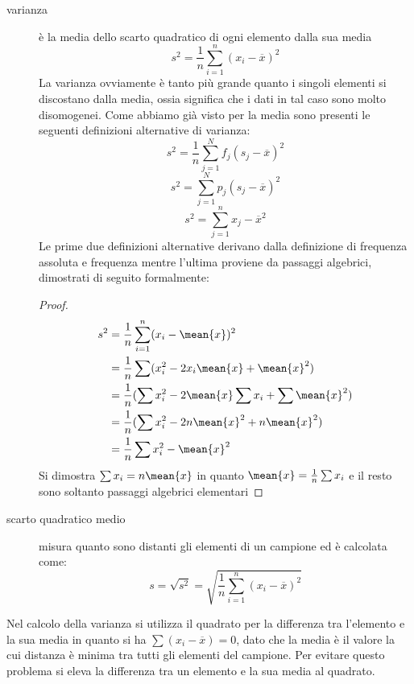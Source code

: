\documentclass[a4paper,12pt, oneside]{book}
\begin{document}
\begin{description}
        \item [varianza] è la media dello scarto quadratico di ogni elemento dalla sua media 
                \[ s^2 = \frac{1}{n} \sum _{i = 1} ^ n (x_i - \overline{x})^2 \]
                La varianza ovviamente è tanto più grande quanto i singoli elementi si discostano dalla media, 
                ossia significa che i dati in tal caso sono molto disomogenei.\newline
                Come abbiamo già visto per la media sono presenti le seguenti definizioni alternative di varianza:
                \[ s^2 = \frac{1}{n} \sum _{j = 1} ^ N f_j (s_j - \overline{x}) ^ 2 \]
                \[ s^2 = \sum _{j = 1} ^ N p_j (s_j - \overline{x}) ^ 2 \]
                \[ s^2 = \sum _{j = 1} ^ n x_j - \overline{x} ^ 2 \]
                Le prime due definizioni alternative derivano dalla definizione di frequenza assoluta e frequenza 
                mentre l'ultima proviene da passaggi algebrici, dimostrati di seguito formalmente:
                \begin{proof}
                        \[ \begin{split}
                            s^2 & = \frac{1}{n} \sum _{i = 1} ^ n (x_i - \mean{x}) ^ 2 \\
                                & = \frac{1}{n} \sum (x_i ^ 2 - 2x_i\mean{x} + \mean{x} ^ 2) \\
                                & = \frac{1}{n} (\sum x_i^2 - 2\mean{x} \sum x_i + \sum \mean{x} ^ 2) \\
                                & = \frac{1}{n} (\sum x_i^2 - 2n\mean{x}^2 + n\mean{x}^2) \\
                                & = \frac{1}{n} \sum x_i^2 - \mean{x} ^ 2 \\
                            \end{split} \]
                Si dimostra $\sum x_i = n \mean{x}$ in quanto $\mean{x} = \frac{1}{n} \sum x_i$ e il resto 
                sono soltanto passaggi algebrici elementari
                \end{proof}

    \item [scarto quadratico medio] misura quanto sono distanti gli elementi di un campione ed è calcolata come:
            \[ s = \sqrt{s^2} = \sqrt{\frac{1}{n} \sum _{i = 1} ^ n (x_i - \overline{x}) ^ 2} \]
\end{description}
Nel calcolo della varianza si utilizza il quadrato per la differenza tra l'elemento e la sua media in quanto 
si ha $\sum (x_i - \overline{x}) = 0$, dato che la media è il valore la cui distanza è minima tra tutti gli 
elementi del campione.\newline
Per evitare questo problema si eleva la differenza tra un elemento e la sua media al quadrato.
\end{document}
